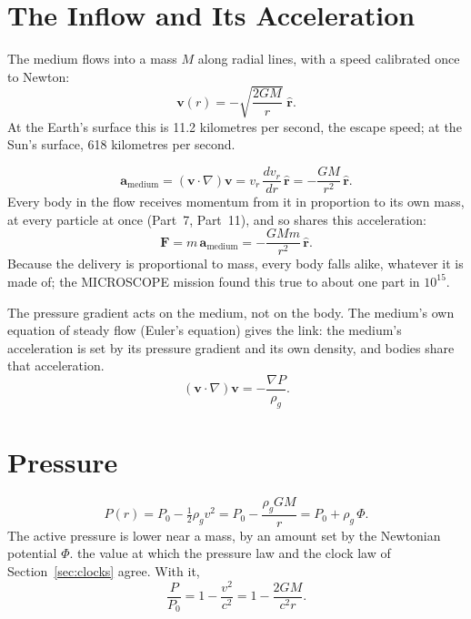 \documentclass[11pt,a4paper]{article}
\begin{document}
\section{The Inflow and Its Acceleration}
\label{sec:inflow}

\begin{hypbar}
The medium flows into a mass $M$ along radial lines, with a speed calibrated once to Newton:
\begin{equation}
\mathbf{v}(r) = -\sqrt{\frac{2GM}{r}}\;\hat{\mathbf{r}}.
\label{eq:inflow}
\end{equation}
At the Earth's surface this is 11.2 kilometres per second, the escape speed; at the Sun's surface, 618 kilometres per second.
\end{hypbar}

\begin{equation}
\mathbf{a}_{\text{medium}} = (\mathbf{v}\cdot\nabla)\mathbf{v} = v_r\,\frac{dv_r}{dr}\,\hat{\mathbf{r}} = -\frac{GM}{r^2}\,\hat{\mathbf{r}}.
\label{eq:accel}
\end{equation}
Every body in the flow receives momentum from it in proportion to its own mass, at every particle at once (Part~7, Part~11), and so shares this acceleration:
\begin{equation}
\mathbf{F} = m\,\mathbf{a}_{\text{medium}} = -\frac{GMm}{r^2}\,\hat{\mathbf{r}}.
\end{equation}
Because the delivery is proportional to mass, every body falls alike, whatever it is made of; the MICROSCOPE mission found this true to about one part in $10^{15}$.

The pressure gradient acts on the medium, not on the body. The medium's own equation of steady flow (Euler's equation) gives the link: the medium's acceleration is set by its pressure gradient and its own density, and bodies share that acceleration.
\begin{equation}
(\mathbf{v}\cdot\nabla)\mathbf{v} = -\frac{\nabla P}{\rho_g}.
\label{eq:euler}
\end{equation}

\section{Pressure}
\label{sec:pressure}

\begin{equation}
P(r) = P_0 - \tfrac12\rho_g v^2 = P_0 - \frac{\rho_g GM}{r} = P_0 + \rho_g\,\Phi.
\label{eq:pressure}
\end{equation}
The active pressure is lower near a mass, by an amount set by the Newtonian potential $\Phi$.  the value at which the pressure law and the clock law of Section~\ref{sec:clocks} agree. With it,
\begin{equation}
\frac{P}{P_0} = 1 - \frac{v^2}{c^2} = 1 - \frac{2GM}{c^2 r}.
\label{eq:ratio}
\end{equation}
\end{document}
